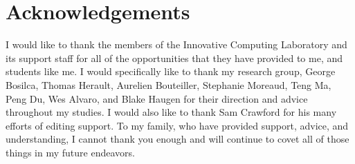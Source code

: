 \chapter*{Acknowledgements}

I would like to thank the members of the Innovative Computing Laboratory and its support staff for all of the opportunities that they have provided to me, and students like me. I would specifically like to thank my research group, George Bosilca, Thomas Herault, Aurelien Bouteiller, Stephanie Moreaud, Teng Ma, Peng Du, Wes Alvaro, and Blake Haugen for their direction and advice throughout my studies. I would also like to thank Sam Crawford for his many efforts of editing support. To my family, who have provided support, advice, and understanding, I cannot thank you enough and will continue to covet all of those things in my future endeavors.